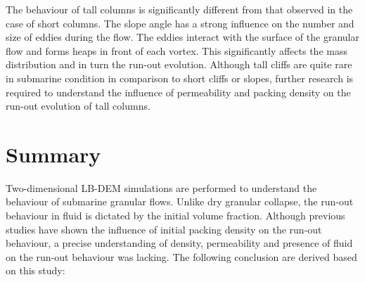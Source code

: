 The behaviour of tall columns is significantly different from that observed in 
the case of short columns. The slope angle has a strong influence on the number 
and size of eddies during the flow. The eddies interact with the surface of the 
granular flow and forms heaps in front of each vortex. This significantly 
affects the mass distribution and in turn the run-out evolution. Although tall 
cliffs are quite rare in submarine condition in comparison to short cliffs or 
slopes, further research is required to understand the influence of 
permeability and packing density on the run-out evolution of tall columns. 

\section{Summary}

Two-dimensional LB-DEM simulations are performed to understand the behaviour 
of submarine granular flows. Unlike dry granular collapse, the run-out 
behaviour in fluid is dictated by the initial volume fraction. Although 
previous studies have shown the influence of initial packing density on the 
run-out behaviour, a precise understanding of density, permeability and 
presence of fluid on the run-out behaviour was lacking. The following 
conclusion are derived based on this study:

